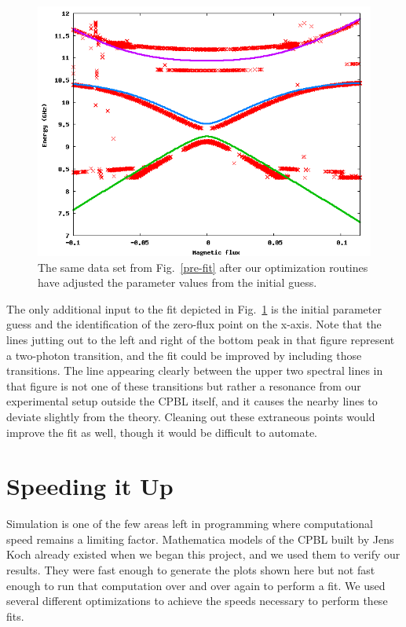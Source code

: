 \documentclass[twocolumn]{revtex4}
\begin{document}
\begin{figure}
\includegraphics[width=\linewidth]{CPBL-postfit.png}
\caption{ The same data set from Fig.~\ref{pre-fit} after our
  optimization routines have adjusted the parameter values from the
  initial guess.}
\label{post-fit}
\end{figure}

The only additional input to the fit depicted in Fig.~\ref{post-fit}
is the initial parameter guess and the identification of the zero-flux
point on the x-axis. Note that the lines jutting out to the left and
right of the bottom peak in that figure represent a two-photon
transition, and the fit could be improved by including those
transitions. The line appearing clearly between the upper two spectral
lines in that figure is not one of these transitions but rather a
resonance from our experimental setup outside the CPBL itself, and it
causes the nearby lines to deviate slightly from the theory. Cleaning
out these extraneous points would improve the fit as well, though it
would be difficult to automate.

\section{Speeding it Up}

Simulation is one of the few areas left in programming where
computational speed remains a limiting factor. Mathematica models of
the CPBL built by Jens Koch already existed when we began this
project, and we used them to verify our results. They were fast enough
to generate the plots shown here but not fast enough to run that
computation over and over again to perform a fit. We used several
different optimizations to achieve the speeds necessary to perform
these fits.
\end{document}
